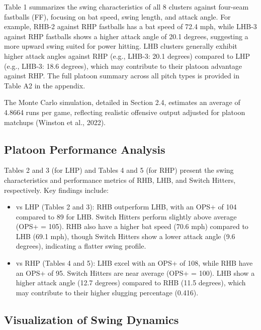 \documentclass[
]{article}
\providecommand{\tightlist}{%
  \setlength{\itemsep}{0pt}\setlength{\parskip}{0pt}}
\begin{document}
Table 1 summarizes the swing characteristics of all 8 clusters against
four-seam fastballs (FF), focusing on bat speed, swing length, and
attack angle. For example, RHB-2 against RHP fastballs has a bat speed
of 72.4 mph, while LHB-3 against RHP fastballs shows a higher attack
angle of 20.1 degrees, suggesting a more upward swing suited for power
hitting. LHB clusters generally exhibit higher attack angles against RHP
(e.g., LHB-3: 20.1 degrees) compared to LHP (e.g., LHB-3: 18.6 degrees),
which may contribute to their platoon advantage against RHP. The full
platoon summary across all pitch types is provided in Table A2 in the
appendix.

The Monte Carlo simulation, detailed in Section 2.4, estimates an
average of 4.8664 runs per game, reflecting realistic offensive output
adjusted for platoon matchups (Winston et al., 2022).

\hypertarget{platoon-performance-analysis}{%
\subsection{Platoon Performance
Analysis}\label{platoon-performance-analysis}}

Tables 2 and 3 (for LHP) and Tables 4 and 5 (for RHP) present the swing
characteristics and performance metrics of RHB, LHB, and Switch Hitters,
respectively. Key findings include:

\begin{itemize}
\tightlist
\item
  vs LHP (Tables 2 and 3): RHB outperform LHB, with an OPS+ of 104
  compared to 89 for LHB. Switch Hitters perform slightly above average
  (OPS+ = 105). RHB also have a higher bat speed (70.6 mph) compared to
  LHB (69.1 mph), though Switch Hitters show a lower attack angle (9.6
  degrees), indicating a flatter swing profile.
\item
  vs RHP (Tables 4 and 5): LHB excel with an OPS+ of 108, while RHB have
  an OPS+ of 95. Switch Hitters are near average (OPS+ = 100). LHB show
  a higher attack angle (12.7 degrees) compared to RHB (11.5 degrees),
  which may contribute to their higher slugging percentage (0.416).
\end{itemize}

\hypertarget{visualization-of-swing-dynamics}{%
\subsection{Visualization of Swing
Dynamics}\label{visualization-of-swing-dynamics}}
\end{document}
